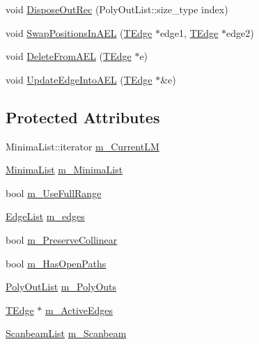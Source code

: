 \begin{DoxyCompactItemize}
\item 
void \mbox{\hyperlink{class_clipper_lib_1_1_clipper_base_ae55667f0f947cb12d401e3ed2d586937}{Dispose\+Out\+Rec}} (Poly\+Out\+List\+::size\+\_\+type index)
\item 
void \mbox{\hyperlink{class_clipper_lib_1_1_clipper_base_ab265485204a9964a6c636d96960ac333}{Swap\+Positions\+In\+A\+EL}} (\mbox{\hyperlink{struct_clipper_lib_1_1_t_edge}{T\+Edge}} $\ast$edge1, \mbox{\hyperlink{struct_clipper_lib_1_1_t_edge}{T\+Edge}} $\ast$edge2)
\item 
void \mbox{\hyperlink{class_clipper_lib_1_1_clipper_base_a92bfe6483a337205191d991e481cb56a}{Delete\+From\+A\+EL}} (\mbox{\hyperlink{struct_clipper_lib_1_1_t_edge}{T\+Edge}} $\ast$e)
\item 
void \mbox{\hyperlink{class_clipper_lib_1_1_clipper_base_a3c67cc7874aa30704f4ee8ce69260c4a}{Update\+Edge\+Into\+A\+EL}} (\mbox{\hyperlink{struct_clipper_lib_1_1_t_edge}{T\+Edge}} $\ast$\&e)
\end{DoxyCompactItemize}
\subsection*{Protected Attributes}
\begin{DoxyCompactItemize}
\item 
Minima\+List\+::iterator \mbox{\hyperlink{class_clipper_lib_1_1_clipper_base_ab6ed40f62810c0f894878c79d74afb36}{m\+\_\+\+Current\+LM}}
\item 
\mbox{\hyperlink{class_clipper_lib_1_1_clipper_base_addb22572066d3983dcd5797c542df00b}{Minima\+List}} \mbox{\hyperlink{class_clipper_lib_1_1_clipper_base_a970749dc12a20e980c932af040f8a8c5}{m\+\_\+\+Minima\+List}}
\item 
bool \mbox{\hyperlink{class_clipper_lib_1_1_clipper_base_aea11d183617adc12d7ba2b84533f7f45}{m\+\_\+\+Use\+Full\+Range}}
\item 
\mbox{\hyperlink{namespace_clipper_lib_a86ece3ad074061d6b3d18819b1fa4ed7}{Edge\+List}} \mbox{\hyperlink{class_clipper_lib_1_1_clipper_base_a8bfc007c0c0afd4e9d252dac0ef5daa0}{m\+\_\+edges}}
\item 
bool \mbox{\hyperlink{class_clipper_lib_1_1_clipper_base_aad4ca0f2a16a6fb466036b36cc5ff638}{m\+\_\+\+Preserve\+Collinear}}
\item 
bool \mbox{\hyperlink{class_clipper_lib_1_1_clipper_base_aa2508f5b2a599294c359271506441fbd}{m\+\_\+\+Has\+Open\+Paths}}
\item 
\mbox{\hyperlink{namespace_clipper_lib_a955330d96f532e139adb1e52a82fcd43}{Poly\+Out\+List}} \mbox{\hyperlink{class_clipper_lib_1_1_clipper_base_adf118fa61f0bd00de746b8dd2b01a2cb}{m\+\_\+\+Poly\+Outs}}
\item 
\mbox{\hyperlink{struct_clipper_lib_1_1_t_edge}{T\+Edge}} $\ast$ \mbox{\hyperlink{class_clipper_lib_1_1_clipper_base_afff39cdfe073a817d45e9e3ac12d68c1}{m\+\_\+\+Active\+Edges}}
\item 
\mbox{\hyperlink{class_clipper_lib_1_1_clipper_base_a517d04b2a0f0bae13a64a819b3bd429e}{Scanbeam\+List}} \mbox{\hyperlink{class_clipper_lib_1_1_clipper_base_a74dba851f53114c06257d407bbcc170e}{m\+\_\+\+Scanbeam}}
\end{DoxyCompactItemize}


